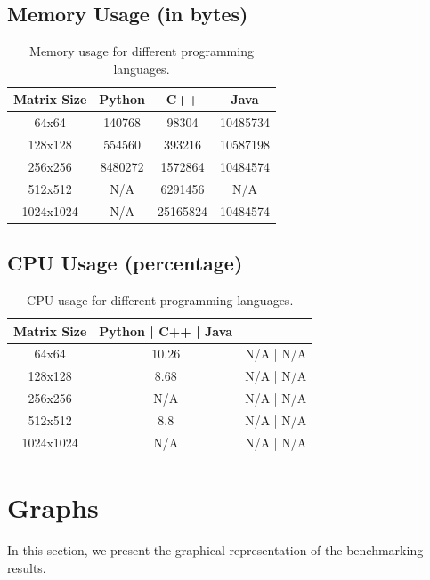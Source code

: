 \documentclass{article}
\begin{document}
\subsection{Memory Usage (in bytes)}
\begin{table}[h]
    \centering
    \begin{tabular}{@{}cccc@{}}
        \toprule
        Matrix Size & Python & C++       & Java        \\ \midrule
        64x64       & 140768 & 98304     & 10485734    \\
        128x128     & 554560 & 393216    & 10587198    \\
        256x256     & 8480272& 1572864   & 10484574    \\
        512x512     & N/A    & 6291456   & N/A         \\
        1024x1024   & N/A    & 25165824  & 10484574    \\ \bottomrule
    \end{tabular}
    \caption{Memory usage for different programming languages.}
\end{table}

\subsection{CPU Usage (percentage)}
\begin{table}[h]
    \centering
    \begin{tabular}{@{}ccc@{}}
        \toprule
        Matrix Size & Python | C++ | Java \\ \midrule
        64x64       & 10.26  & N/A | N/A  \\
        128x128     & 8.68   & N/A | N/A  \\
        256x256     & N/A    & N/A | N/A  \\
        512x512     & 8.8    & N/A | N/A  \\
        1024x1024   & N/A    & N/A | N/A  \\ \bottomrule
    \end{tabular}
    \caption{CPU usage for different programming languages.}
\end{table}

\section{Graphs}
In this section, we present the graphical representation of the benchmarking results. 
\end{document}
